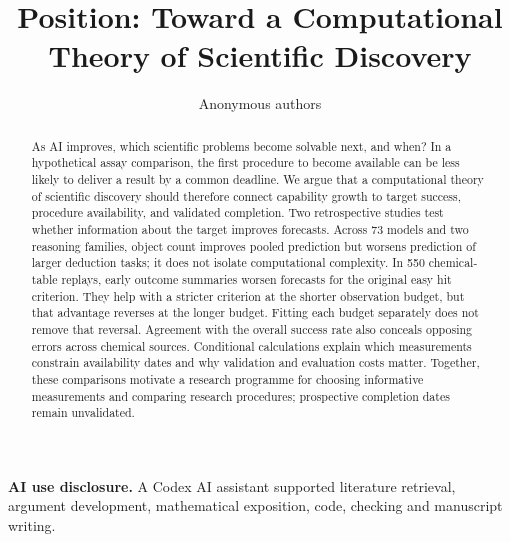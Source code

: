 \documentclass{article}
\title{Position: Toward a Computational Theory of Scientific Discovery}
\author{Anonymous authors}
\begin{document}
\maketitle
\begin{abstract}
As AI improves, which scientific problems become solvable next, and when? In a hypothetical assay comparison, the first procedure to become available can be less likely to deliver a result by a common deadline. We argue that a computational theory of scientific discovery should therefore connect capability growth to target success, procedure availability, and validated completion. Two retrospective studies test whether information about the target improves forecasts. Across 73 models and two reasoning families, object count improves pooled prediction but worsens prediction of larger deduction tasks; it does not isolate computational complexity. In 550 chemical-table replays, early outcome summaries worsen forecasts for the original easy hit criterion. They help with a stricter criterion at the shorter observation budget, but that advantage reverses at the longer budget. Fitting each budget separately does not remove that reversal. Agreement with the overall success rate also conceals opposing errors across chemical sources. Conditional calculations explain which measurements constrain availability dates and why validation and evaluation costs matter. Together, these comparisons motivate a research programme for choosing informative measurements and comparing research procedures; prospective completion dates remain unvalidated.
\end{abstract}

\par\noindent\textbf{AI use disclosure.}
A Codex AI assistant supported literature retrieval, argument development, mathematical exposition, code, checking and manuscript writing.
\clearpage


\clearpage

\end{document}
